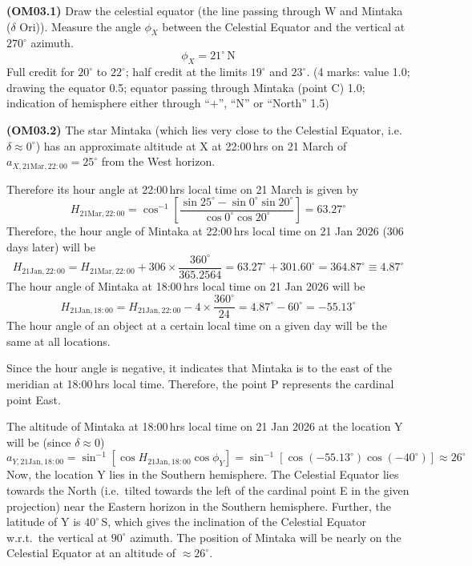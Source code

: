 \textbf{(OM03.1)} Draw the celestial equator (the line passing through W and
Mintaka ($\delta$ Ori)). Measure the angle $\phi_X$ between the Celestial
Equator and the vertical at $270^\circ$ azimuth.
\[ \phi_X = 21^\circ\,\mathrm{N} \]
Full credit for $20^\circ$ to $22^\circ$; half credit at the limits
$19^\circ$ and $23^\circ$. \hfill(4 marks: value 1.0; drawing the equator
0.5; equator passing through Mintaka (point C) 1.0; indication of
hemisphere either through ``$+$'', ``N'' or ``North'' 1.5)


\textbf{(OM03.2)} The star Mintaka (which lies very close to the Celestial
Equator, i.e.\ $\delta \approx 0^\circ$) has an approximate altitude at X at
22:00\,hrs on 21 March of $a_{X,\mathrm{21Mar},22:00} = 25^\circ$ from the
West horizon.

Therefore its hour angle at 22:00\,hrs local time on 21 March is given by
\[ H_{\mathrm{21Mar},22:00}
   = \cos^{-1}\!\left[\frac{\sin 25^\circ - \sin 0^\circ \sin 20^\circ}
                           {\cos 0^\circ \cos 20^\circ}\right]
   = 63.27^\circ \]
Therefore, the hour angle of Mintaka at 22:00\,hrs local time on 21 Jan 2026
(306 days later) will be
\[ H_{\mathrm{21Jan},22:00}
   = H_{\mathrm{21Mar},22:00} + 306 \times \frac{360^\circ}{365.2564}
   = 63.27^\circ + 301.60^\circ = 364.87^\circ \equiv 4.87^\circ \]
The hour angle of Mintaka at 18:00\,hrs local time on 21 Jan 2026 will be
\[ H_{\mathrm{21Jan},18:00}
   = H_{\mathrm{21Jan},22:00} - 4 \times \frac{360^\circ}{24}
   = 4.87^\circ - 60^\circ = -55.13^\circ \]
The hour angle of an object at a certain local time on a given day will be
the same at all locations.

Since the hour angle is negative, it indicates that Mintaka is to the east
of the meridian at 18:00\,hrs local time. Therefore, the point P represents
the cardinal point East.

The altitude of Mintaka at 18:00\,hrs local time on 21 Jan 2026 at the
location Y will be (since $\delta \approx 0$)
\[ a_{Y,\mathrm{21Jan},18:00}
   = \sin^{-1}\!\left[\cos H_{\mathrm{21Jan},18:00} \cos\phi_Y\right]
   = \sin^{-1}\!\left[\cos(-55.13^\circ)\cos(-40^\circ)\right]
   \approx 26^\circ \]
Now, the location Y lies in the Southern hemisphere. The Celestial Equator
lies towards the North (i.e.\ tilted towards the left of the cardinal point
E in the given projection) near the Eastern horizon in the Southern
hemisphere. Further, the latitude of Y is $40^\circ$\,S, which gives the
inclination of the Celestial Equator w.r.t.\ the vertical at $90^\circ$
azimuth. The position of Mintaka will be nearly on the Celestial Equator at
an altitude of $\approx 26^\circ$.

